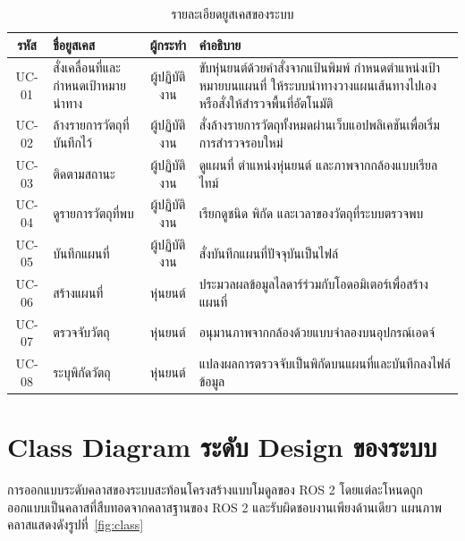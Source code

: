 \documentclass[a4paper,12pt]{report}
\begin{document}
\begin{table}[H]
\centering
\caption[รายละเอียดยูสเคสของระบบ (บทที่ 3)]{รายละเอียดยูสเคสของระบบ}
\label{tab:usecase}
\small
\begin{tabularx}{\textwidth}{|c|>{\raggedright\arraybackslash}p{3.6cm}|c|X|}
\hline
\textbf{รหัส} & \textbf{ชื่อยูสเคส} & \textbf{ผู้กระทำ} & \textbf{คำอธิบาย} \\
\hline
UC-01 & สั่งเคลื่อนที่และกำหนดเป้าหมายนำทาง & ผู้ปฏิบัติงาน
      & ขับหุ่นยนต์ด้วยคำสั่งจากแป้นพิมพ์ กำหนดตำแหน่งเป้าหมายบนแผนที่
        ให้ระบบนำทางวางแผนเส้นทางไปเอง หรือสั่งให้สำรวจพื้นที่อัตโนมัติ \\
\hline
UC-02 & ล้างรายการวัตถุที่บันทึกไว้ & ผู้ปฏิบัติงาน
      & สั่งล้างรายการวัตถุทั้งหมดผ่านเว็บแอปพลิเคชันเพื่อเริ่มการสำรวจรอบใหม่ \\
\hline
UC-03 & ติดตามสถานะ & ผู้ปฏิบัติงาน & ดูแผนที่ ตำแหน่งหุ่นยนต์ และภาพจากกล้องแบบเรียลไทม์ \\
\hline
UC-04 & ดูรายการวัตถุที่พบ & ผู้ปฏิบัติงาน & เรียกดูชนิด พิกัด และเวลาของวัตถุที่ระบบตรวจพบ \\
\hline
UC-05 & บันทึกแผนที่ & ผู้ปฏิบัติงาน & สั่งบันทึกแผนที่ปัจจุบันเป็นไฟล์ \\
\hline
UC-06 & สร้างแผนที่ & หุ่นยนต์ & ประมวลผลข้อมูลไลดาร์ร่วมกับโอดอมิเตอร์เพื่อสร้างแผนที่ \\
\hline
UC-07 & ตรวจจับวัตถุ & หุ่นยนต์ & อนุมานภาพจากกล้องด้วยแบบจำลองบนอุปกรณ์เอดจ์ \\
\hline
UC-08 & ระบุพิกัดวัตถุ & หุ่นยนต์ & แปลงผลการตรวจจับเป็นพิกัดบนแผนที่และบันทึกลงไฟล์ข้อมูล \\
\hline
\end{tabularx}
\end{table}

\section{Class Diagram ระดับ Design ของระบบ}

การออกแบบระดับคลาสของระบบสะท้อนโครงสร้างแบบโมดูลของ ROS 2
โดยแต่ละโหนดถูกออกแบบเป็นคลาสที่สืบทอดจากคลาสฐานของ ROS 2
และรับผิดชอบงานเพียงด้านเดียว แผนภาพคลาสแสดงดังรูปที่~\ref{fig:class}
\end{document}
